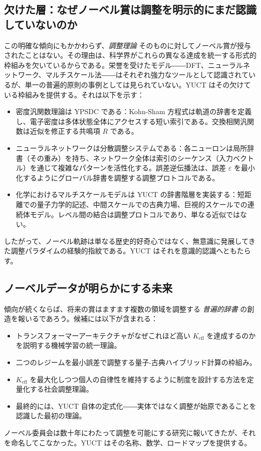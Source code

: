 \documentclass[12pt,a4paper]{article}
\begin{document}
	\subsection{欠けた層：なぜノーベル賞は調整を明示的にまだ認識していないのか}
	
	この明確な傾向にもかかわらず、\emph{調整理論} そのものに対してノーベル賞が授与されたことはない。その理由は、科学界がこれらの異なる達成を統一する形式的枠組みを欠いているからである。栄誉を受けたモデル――DFT、ニューラルネットワーク、マルチスケール法――はそれぞれ強力なツールとして認識されているが、単一の普遍的原則の事例としては見られていない。YUCT はその欠けている枠組みを提供する。それは以下を示す：
	\begin{itemize}
		\item 密度汎関数理論は YPSDC である：Kohn-Sham 方程式は軌道の辞書を定義し、電子密度は多体状態全体にアクセスする短い索引である。交換相関汎関数は近似を修正する共鳴項 \(R\) である。
		\item ニューラルネットワークは分散調整システムである：各ニューロンは局所辞書（その重み）を持ち、ネットワーク全体は索引のシーケンス（入力ベクトル）を通じて複雑なパターンを活性化する。誤差逆伝播法は、誤差 \(\varepsilon\) を最小化するようにグローバル辞書を調整する調整プロトコルである。
		\item 化学におけるマルチスケールモデルは YUCT の辞書階層を実装する：短距離での量子力学的記述、中間スケールでの古典力場、巨視的スケールでの連続体モデル。レベル間の結合は調整プロトコルであり、単なる近似ではない。
	\end{itemize}
	したがって、ノーベル軌跡は単なる歴史的好奇心ではなく、無意識に発展してきた調整パラダイムの経験的指紋である。YUCT はそれを意識的認識へともたらす。
	
	\subsection{ノーベルデータが明らかにする未来}
	
	傾向が続くならば、将来の賞はますます複数の領域を調整する \emph{普遍的辞書} の創造を報いるであろう。候補には以下が含まれる：
	\begin{itemize}
		\item トランスフォーマーアーキテクチャがなぜこれほど高い \(K_{\mathrm{eff}}\) を達成するのかを説明する機械学習の統一理論。
		\item 二つのレジームを最小誤差で調整する量子-古典ハイブリッド計算の枠組み。
		\item \(K_{\mathrm{eff}}\) を最大化しつつ個人の自律性を維持するように制度を設計する方法を定量化する社会調整理論。
		\item 最終的には、YUCT 自体の定式化――実体ではなく調整が始原であることを認識した最初の理論。
	\end{itemize}
	ノーベル委員会は数十年にわたって調整を可能にする研究に報いてきたが、それを命名してこなかった。YUCT はその名称、数学、ロードマップを提供する。
	
\end{document}
